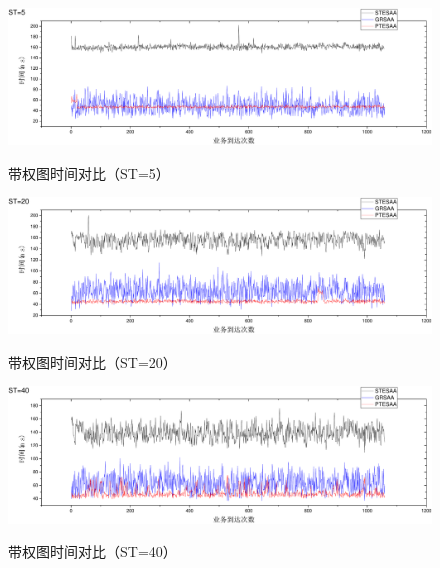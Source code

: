 \begin{figure}
\setlength{\belowcaptionskip}{-0.5cm}
\begin{center}
{\includegraphics[width=1 \textwidth]{figures/H5T.pdf}}
\end{center}
\caption{{\footnotesize{带权图时间对比（ST=5）}}}
\label{H5T}
\end{figure}
\begin{figure}
\setlength{\belowcaptionskip}{-0.5cm}
\begin{center}
{\includegraphics[width=1 \textwidth]{figures/H20T.pdf}}
\end{center}
\caption{{\footnotesize{带权图时间对比（ST=20）}}}
\label{H20T}
\end{figure}
\begin{figure}
\setlength{\belowcaptionskip}{-0.5cm}
\begin{center}
\vspace{-0.5cm}
{\includegraphics[width=1 \textwidth]{figures/H40T.pdf}}
\end{center}
\caption{{\footnotesize{带权图时间对比（ST=40）}}}
\label{H40T}
\end{figure}
